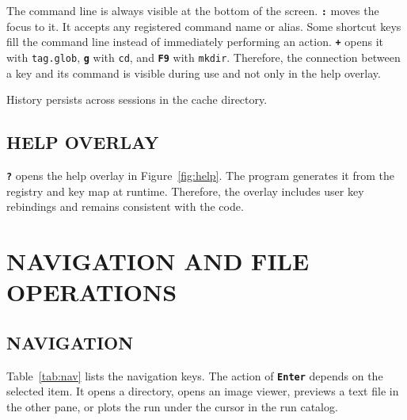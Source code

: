 \documentclass[tm]{ornltm}
\newcommand{\key}[1]{\textbf{\texttt{#1}}}
\begin{document}
The command line is always visible at the bottom of the screen. \key{:} moves
the focus to it. It accepts any registered command name or alias. Some shortcut
keys fill the command line instead of immediately performing an action.
\key{+} opens it with \texttt{tag.glob}, \key{g} with \texttt{cd}, and \key{F9}
with \texttt{mkdir}. Therefore, the connection between a key and its command is
visible during use and not only in the help overlay.

History persists across sessions in the cache directory.

\subsection{HELP OVERLAY}

\key{?} opens the help overlay in Figure~\ref{fig:help}. The program generates
it from the registry and key map at runtime. Therefore, the overlay includes
user key rebindings and remains consistent with the code.

\section{NAVIGATION AND FILE OPERATIONS}
\label{sec:fileops}

\subsection{NAVIGATION}

Table~\ref{tab:nav} lists the navigation keys. The action of \key{Enter} depends
on the selected item. It opens a directory, opens an image viewer, previews a
text file in the other pane, or plots the run under the cursor in the run
catalog.
\end{document}
